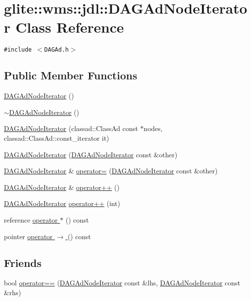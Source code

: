 \hypertarget{classglite_1_1wms_1_1jdl_1_1DAGAdNodeIterator}{
\section{glite::wms::jdl::DAGAd\-Node\-Iterator Class Reference}
\label{classglite_1_1wms_1_1jdl_1_1DAGAdNodeIterator}
}
{\tt \#include $<$DAGAd.h$>$}

\subsection*{Public Member Functions}
\begin{CompactItemize}
\item 
\hyperlink{classglite_1_1wms_1_1jdl_1_1DAGAdNodeIterator_a0}{DAGAd\-Node\-Iterator} ()
\item 
\hyperlink{classglite_1_1wms_1_1jdl_1_1DAGAdNodeIterator_a1}{$\sim$DAGAd\-Node\-Iterator} ()
\item 
\hyperlink{classglite_1_1wms_1_1jdl_1_1DAGAdNodeIterator_a2}{DAGAd\-Node\-Iterator} (classad::Class\-Ad const $\ast$nodes, classad::Class\-Ad::const\_\-iterator it)
\item 
\hyperlink{classglite_1_1wms_1_1jdl_1_1DAGAdNodeIterator_a3}{DAGAd\-Node\-Iterator} (\hyperlink{classglite_1_1wms_1_1jdl_1_1DAGAdNodeIterator}{DAGAd\-Node\-Iterator} const \&other)
\item 
\hyperlink{classglite_1_1wms_1_1jdl_1_1DAGAdNodeIterator}{DAGAd\-Node\-Iterator} \& \hyperlink{classglite_1_1wms_1_1jdl_1_1DAGAdNodeIterator_a4}{operator=} (\hyperlink{classglite_1_1wms_1_1jdl_1_1DAGAdNodeIterator}{DAGAd\-Node\-Iterator} const \&other)
\item 
\hyperlink{classglite_1_1wms_1_1jdl_1_1DAGAdNodeIterator}{DAGAd\-Node\-Iterator} \& \hyperlink{classglite_1_1wms_1_1jdl_1_1DAGAdNodeIterator_a5}{operator++} ()
\item 
\hyperlink{classglite_1_1wms_1_1jdl_1_1DAGAdNodeIterator}{DAGAd\-Node\-Iterator} \hyperlink{classglite_1_1wms_1_1jdl_1_1DAGAdNodeIterator_a6}{operator++} (int)
\item 
reference \hyperlink{classglite_1_1wms_1_1jdl_1_1DAGAdNodeIterator_a7}{operator $\ast$} () const 
\item 
pointer \hyperlink{classglite_1_1wms_1_1jdl_1_1DAGAdNodeIterator_a8}{operator $\rightarrow$ } () const 
\end{CompactItemize}
\subsection*{Friends}
\begin{CompactItemize}
\item 
bool \hyperlink{classglite_1_1wms_1_1jdl_1_1DAGAdNodeIterator_n0}{operator==} (\hyperlink{classglite_1_1wms_1_1jdl_1_1DAGAdNodeIterator}{DAGAd\-Node\-Iterator} const \&lhs, \hyperlink{classglite_1_1wms_1_1jdl_1_1DAGAdNodeIterator}{DAGAd\-Node\-Iterator} const \&rhs)
\end{CompactItemize}


